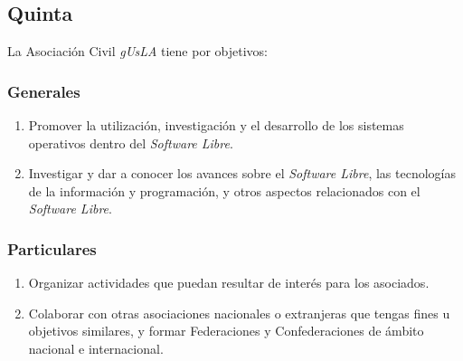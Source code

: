       \subsection{Quinta} 
      La Asociaci\'on Civil \emph{gUsLA} tiene por objetivos:
      
      \subsubsection{Generales}
        
        \begin{enumerate}
          \item Promover la utilizaci\'on, investigaci\'on y el desarrollo de
          los sistemas operativos dentro del \emph{Software Libre}.
          \item Investigar y dar a conocer los avances sobre el \emph{Software
          Libre}, las tecnolog\'i{}as de la informaci\'on y programaci\'on, y
          otros aspectos relacionados con el \emph{Software Libre}.
        \end{enumerate}
      
      \subsubsection{Particulares}
        
        \begin{enumerate}
          \item Organizar actividades que puedan resultar de inter\'es para los
          asociados.
          \item Colaborar con otras asociaciones nacionales o extranjeras que
          tengas fines u objetivos similares, y formar Federaciones y
          Confederaciones de \'ambito nacional e internacional.
        \end{enumerate}
